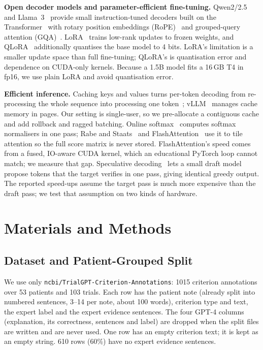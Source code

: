 \documentclass[conference]{IEEEtran}
\newcommand{\code}[1]{\texttt{\small #1}}
\begin{document}
\textbf{Open decoder models and parameter-efficient fine-tuning.} Qwen2/2.5~\cite{yang2024qwen2,qwen2.5} and Llama~3~\cite{dubey2024llama3} provide small instruction-tuned decoders built on the Transformer~\cite{vaswani2017attention} with rotary position embeddings (RoPE)~\cite{su2024roformer} and grouped-query attention (GQA)~\cite{ainslie2023gqa}. LoRA~\cite{hu2022lora} trains low-rank updates to frozen weights, and QLoRA~\cite{dettmers2023qlora} additionally quantises the base model to 4 bits. LoRA's limitation is a smaller update space than full fine-tuning; QLoRA's is quantisation error and dependence on CUDA-only kernels. Because a 1.5B model fits a 16\,GB T4 in fp16, we use plain LoRA and avoid quantisation error.

\textbf{Efficient inference.} Caching keys and values turns per-token decoding from re-processing the whole sequence into processing one token~\cite{pope2023scaling}; vLLM~\cite{kwon2023vllm} manages cache memory in pages. Our setting is single-user, so we pre-allocate a contiguous cache and add rollback and ragged batching. Online softmax~\cite{milakov2018online} computes softmax normalisers in one pass; Rabe and Staats~\cite{rabe2021selfattention} and FlashAttention~\cite{dao2022flashattention} use it to tile attention so the full score matrix is never stored. FlashAttention's speed comes from a fused, IO-aware CUDA kernel, which an educational PyTorch loop cannot match; we measure that gap. Speculative decoding~\cite{leviathan2023speculative,chen2023speculative} lets a small draft model propose tokens that the target verifies in one pass, giving identical greedy output. The reported speed-ups assume the target pass is much more expensive than the draft pass; we test that assumption on two kinds of hardware.

\section{Materials and Methods}
\subsection{Dataset and Patient-Grouped Split}
We use only \code{ncbi/TrialGPT-Criterion-Annotations}: 1015 criterion annotations over 53 patients and 103 trials. Each row has the patient note (already split into numbered sentences, 3--14 per note, about 100 words), criterion type and text, the expert label and the expert evidence sentences. The four GPT-4 columns (explanation, its correctness, sentences and label) are dropped when the split files are written and are never used. One row has an empty criterion text; it is kept as an empty string. 610 rows (60\%) have no expert evidence sentences.
\end{document}
